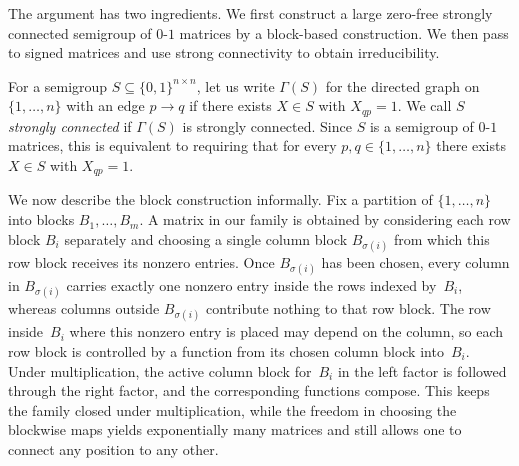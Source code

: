 \documentclass{lmcs}
\theoremstyle{definition}
\begin{document}
The argument has two ingredients. We first construct a large zero-free strongly connected semigroup of $0$-$1$ matrices by a block-based construction. We then pass to signed matrices and use strong connectivity to obtain irreducibility.

For a semigroup $S \subseteq \{0,1\}^{n \times n}$, let us write $\Gamma(S)$ for the directed graph on $\{1,\ldots,n\}$ with an edge $p \to q$ if there exists $X \in S$ with $X_{q p} = 1$. We call $S$ \emph{strongly connected} if $\Gamma(S)$ is strongly connected. Since $S$ is a semigroup of $0$-$1$ matrices, this is equivalent to requiring that for every $p,q \in \{1,\ldots,n\}$ there exists $X \in S$ with $X_{q p} = 1$.

We now describe the block construction informally. Fix a partition of $\{1,\ldots,n\}$ into blocks $B_1,\ldots,B_m$. A matrix in our family is obtained by considering each row block $B_i$ separately and choosing a single column block $B_{\sigma(i)}$ from which this row block receives its nonzero entries. Once $B_{\sigma(i)}$ has been chosen, every column in $B_{\sigma(i)}$ carries exactly one nonzero entry inside the rows indexed by~$B_i$, whereas columns outside $B_{\sigma(i)}$ contribute nothing to that row block. The row inside~$B_i$ where this nonzero entry is placed may depend on the column, so each row block is controlled by a function from its chosen column block into~$B_i$. Under multiplication, the active column block for~$B_i$ in the left factor is followed through the right factor, and the corresponding functions compose. This keeps the family closed under multiplication, while the freedom in choosing the blockwise maps yields exponentially many matrices and still allows one to connect any position to any other.
\end{document}
